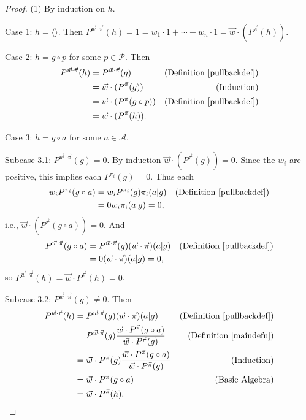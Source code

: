 \documentclass[twoside]{article}
\begin{document}
\begin{proof}
    (1) By induction on $h$.

    Case 1: $h=\langle\rangle$. Then
    $P^{\vec w\cdot\vec\pi}(h)=1=w_1\cdot 1+\cdots+w_n\cdot 1
    =\vec w\cdot ({P^{\vec\pi}}(h))$.

    Case 2: $h=g\circ p$ for some $p\in\mathcal P$. Then
    \begin{align*}
        P^{\vec w\cdot\vec\pi}(h)
            &= P^{\vec w\cdot\vec\pi}(g)
                &\mbox{(Definition \ref{pullbackdef})}\\
            &= \vec w\cdot({P^{\vec\pi}}(g))
                &\mbox{(Induction)}\\
            &= \vec w\cdot({P^{\vec\pi}}(g\circ p))
                &\mbox{(Definition \ref{pullbackdef})}\\
            &= \vec w\cdot({P^{\vec\pi}}(h)).
    \end{align*}

    Case 3: $h=g\circ a$ for some $a\in\mathcal A$.

    Subcase 3.1: $P^{\vec w\cdot\vec\pi}(g)=0$.
        By induction $\vec w\cdot({P^{\vec\pi}}(g))=0$.
        Since the $w_i$ are positive, this implies
        each $P^{\pi_i}(g)=0$.
        Thus each
        \begin{align*}
            w_i P^{\pi_i}(g\circ a)
                &= w_i P^{\pi_i}(g)\pi_i(a|g)
                    &\mbox{(Definition \ref{pullbackdef})}\\
                &= 0w_i\pi_i(a|g)=0,
        \end{align*}
        i.e., $\vec w\cdot({P^{\vec\pi}}(g\circ a))=0$.
        And
        \begin{align*}
            P^{\vec w\cdot\vec\pi}(g\circ a)
                &= P^{\vec w\cdot\vec\pi}(g)(\vec w\cdot\vec\pi)(a|g)
                    &\mbox{(Definition \ref{pullbackdef})}\\
                &= 0(\vec w\cdot\vec\pi)(a|g) = 0,
        \end{align*}
        so $P^{\vec w\cdot\vec\pi}(h)=\vec w\cdot P^{\vec\pi}(h)=0$.

    Subcase 3.2: ${P^{\vec w\cdot\vec\pi}}(g)\not=0$. Then
    \begin{align*}
        P^{\vec w\cdot\vec\pi}(h)
            &= P^{\vec w\cdot\vec\pi}(g)(\vec w\cdot\vec\pi)(a|g)
                &\mbox{(Definition \ref{pullbackdef})}\\
            &= P^{\vec w\cdot\vec\pi}(g)
                \frac
                {\vec w\cdot {P^{\vec\pi}}(g\circ a)}
                {\vec w\cdot {P^{\vec\pi}}(g)}
                &\mbox{(Definition \ref{maindefn})}\\
            &= \vec w\cdot {P^{\vec\pi}}(g)
                \frac
                {\vec w\cdot {P^{\vec\pi}}(g\circ a)}
                {\vec w\cdot {P^{\vec\pi}}(g)}
                &\mbox{(Induction)}\\
            &= \vec w\cdot {P^{\vec\pi}}(g\circ a)
                &\mbox{(Basic Algebra)}\\
            &= \vec w\cdot {P^{\vec\pi}}(h).
    \end{align*}


\end{proof}
\end{document}
